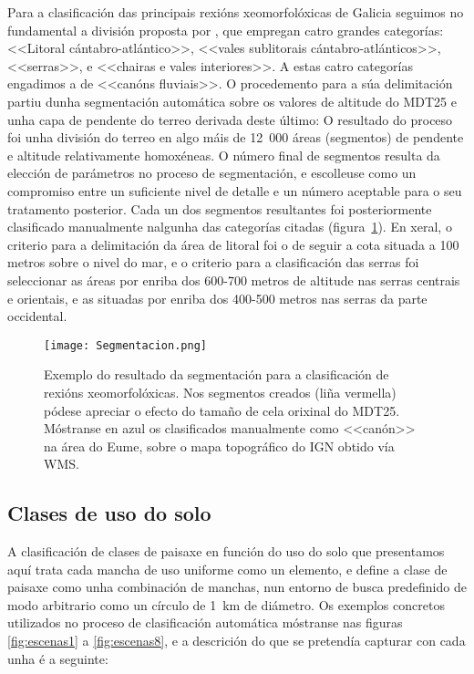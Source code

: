 \documentclass[11pt,a4paper]{article}
\begin{document}
Para a clasificación das principais rexións xeomorfolóxicas de Galicia seguimos no fundamental a división proposta por \citet{Ramil2005}, que empregan catro grandes categorías: <<Litoral cántabro-atlántico>>, <<vales sublitorais cántabro-atlánticos>>, <<serras>>, e <<chairas e vales interiores>>. A estas catro categorías engadimos a de <<canóns fluviais>>.
O procedemento para a súa delimitación partiu dunha segmentación automática sobre os valores de altitude do MDT25 e unha capa de pendente do terreo derivada deste último: O resultado do proceso foi unha división do terreo en algo máis de 12~000 áreas (segmentos) de pendente e altitude relativamente homoxéneas. O número final de segmentos resulta da elección de parámetros no proceso de segmentación, e escolleuse como un compromiso entre un suficiente nivel de detalle e un número aceptable para o seu tratamento posterior. Cada un dos segmentos resultantes foi posteriormente clasificado manualmente nalgunha das categorías citadas (figura~\ref{fig:Morfo}). En xeral, o criterio para a delimitación da área de litoral foi o de seguir a cota situada a 100 metros sobre o nivel do mar, e o criterio para a clasificación das serras foi seleccionar as áreas por enriba dos 600-700 metros de altitude \citep{PerezAlberti1986} nas serras centrais e orientais, e as situadas por enriba dos 400-500 metros nas serras da parte occidental.


\begin{figure}
\caption{Exemplo do resultado da segmentación para a clasificación de rexións xeomorfolóxicas. Nos segmentos creados (liña vermella) pódese apreciar o efecto do tamaño de cela orixinal do MDT25. Móstranse en azul os clasificados manualmente como <<canón>> na área do Eume, sobre o mapa topográfico do IGN obtido vía WMS.}\label{fig:Morfo}
\texttt{[image: Segmentacion.png]}
\end{figure}

\subsection{Clases de uso do solo}

A clasificación de clases de paisaxe en función do uso do solo que presentamos aquí trata cada mancha de uso uniforme como un elemento, e define a clase de paisaxe como unha combinación de manchas, nun entorno de busca predefinido de modo arbitrario como un círculo de 1~km de diámetro. Os exemplos concretos utilizados no proceso de clasificación automática móstranse nas figuras \ref{fig:escenas1} a \ref{fig:escenas8}, e a descrición do que se pretendía capturar con cada unha é a seguinte:
\end{document}
